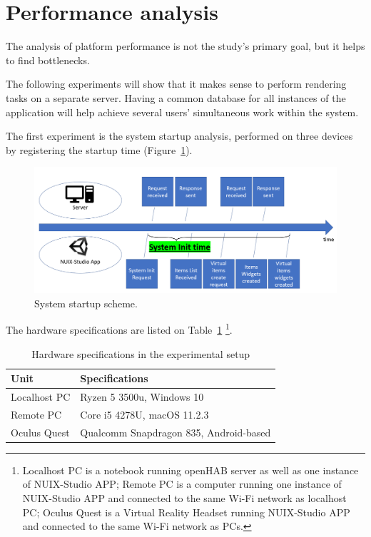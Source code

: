 \section{Performance analysis}

The analysis of platform performance is not the study's primary goal, but it helps to find bottlenecks. 

The following experiments will show that it makes sense to perform rendering tasks on a separate server. Having a common database for all instances of the application will help achieve several users' simultaneous work within the system.

The first experiment is the system startup analysis, performed on three devices by registering the startup time (Figure~\ref{fig:SystemStartupScheme-figure}).

\begin{figure}
  \centering
  \includegraphics[width = 0.9 \linewidth]{figures/SystemStartupScheme.png}
  \caption{System startup scheme.}
  \label{fig:SystemStartupScheme-figure}
\end{figure}

The hardware specifications are listed on Table~\ref{tab:hardware-specifications-table} \footnote{Localhost PC is a notebook running openHAB server as well as one instance of NUIX-Studio APP; Remote PC is a computer running one instance of NUIX-Studio APP and connected to the same Wi-Fi network as localhost PC; Oculus Quest is a Virtual Reality Headset running NUIX-Studio APP and connected to the same Wi-Fi network as PCs.}.

\begin{table}
  \centering
  \begin{threeparttable}[c]
    \caption{Hardware specifications in the experimental setup}
    \label{tab:hardware-specifications-table}
    \begin{tabular}{ll}
      \toprule
      Unit    &         Specifications                 \\
      \midrule
      Localhost PC & Ryzen 5 3500u, Windows 10 \\
      Remote PC & Core i5 4278U, macOS 11.2.3    \\
      Oculus Quest        & Qualcomm Snapdragon 835, Android-based            \\
      \bottomrule
    \end{tabular}
  \end{threeparttable}
\end{table}

